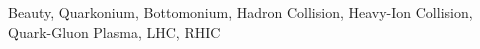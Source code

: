 \documentclass[review]{elsarticle}
\begin{document}
  

\begin{keyword}
   Beauty, Quarkonium, Bottomonium, Hadron Collision, Heavy-Ion Collision, Quark-Gluon Plasma, LHC, RHIC
\end{keyword}
  

 

\maketitle

\newpage

\tableofcontents











\end{document}
